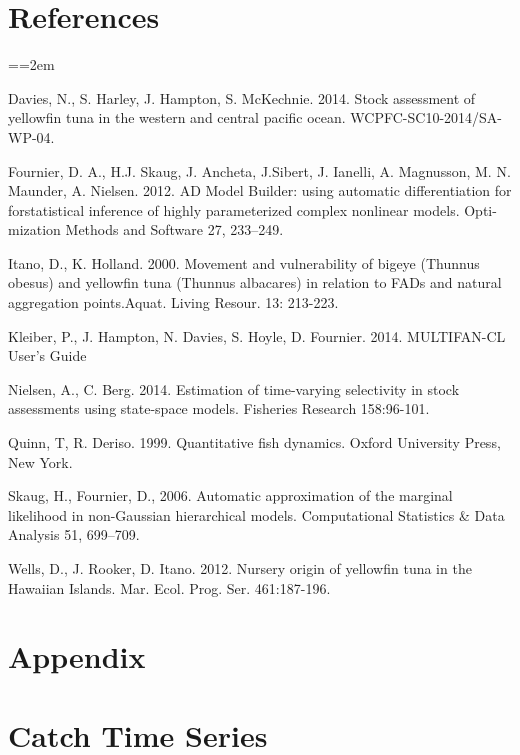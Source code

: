 \documentclass[12pt,letterpaper,twoside]{article}
\newcommand\doublespacing{\baselineskip=1.6\normalbaselineskip}
\begin{document}
\section*{References}
{\parindent=0cm \small
\everypar={\hangindent=2em }\par

Davies, N., S. Harley, J. Hampton, S. McKechnie. 2014. Stock
assessment of yellowfin tuna in the western and central pacific ocean.
WCPFC-SC10-2014/SA-WP-04.

Fournier, D. A., H.J. Skaug, J. Ancheta, J.Sibert, J. Ianelli, 
A. Magnusson, M. N. Maunder, A. Nielsen. 2012. AD Model Builder:
using automatic differentiation for forstatistical inference of highly
parameterized complex nonlinear models. Opti-mization Methods and
Software 27, 233–249.

Itano, D., K. Holland. 2000.  Movement and vulnerability of bigeye
(Thunnus obesus) and yellowfin tuna (Thunnus albacares) in relation to
FADs and natural aggregation points.Aquat. Living Resour. 13: 213-223.

Kleiber, P., J. Hampton, N. Davies, S. Hoyle, D. Fournier. 2014.
MULTIFAN-CL User’s Guide

Nielsen, A., C. Berg. 2014. Estimation of time-varying selectivity
in stock assessments using state-space models. Fisheries Research
158:96-101.

Quinn, T, R. Deriso. 1999. Quantitative fish dynamics. Oxford
University Press, New York.

Skaug, H., Fournier, D., 2006. Automatic approximation of the marginal
likelihood in non-Gaussian hierarchical models. Computational
Statistics \& Data Analysis 51, 699–709.

Wells, D., J. Rooker, D. Itano. 2012.  Nursery origin of yellowfin
tuna in the Hawaiian Islands. Mar. Ecol. Prog. Ser. 461:187-196. 
\par}

\clearpage


\section*{Appendix}
\appendix

\section{Catch Time Series}
\label{sec:data}
\end{document}
